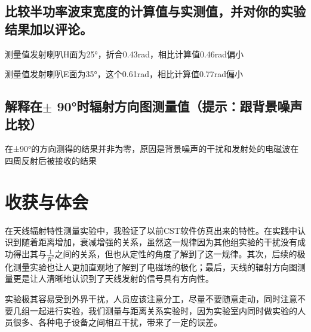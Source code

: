 \documentclass{../source/zjureport}
\begin{document}
    \subsection{比较半功率波束宽度的计算值与实测值，并对你的实验结果加以评论。}
    测量值发射喇叭H面为25°，折合0.43rad，相比计算值0.46rad偏小

    测量值发射喇叭E面为35°，这个0.61rad，相比计算值0.77rad偏小

    \subsection{解释在$\pm$ 90°时辐射方向图测量值（提示：跟背景噪声比较）}
    在±90°的方向测得的结果并非为零，原因是背景噪声的干扰和发射处的电磁波在四周反射后被接收的结果

    \section{收获与体会}
    在天线辐射特性测量实验中，我验证了以前CST软件仿真出来的特性。在实践中认识到随着距离增加，衰减增强的关系，虽然这一规律因为其他组实验的干扰没有成功得出其与$\frac{1}{R^2}$之间的关系，但也从定性的角度了解到了这一规律。其次，后续的极化测量实验也让人更加直观地了解到了电磁场的极化；最后，天线的辐射方向图测量更是让人清晰地认识到了天线发射的信号具有方向性。

    实验极其容易受到外界干扰，人员应该注意分工，尽量不要随意走动，同时注意不要几组一起进行实验，我们测量与距离关系实验时，因为实验室内同时做实验的人员很多、各种电子设备之间相互干扰，带来了一定的误差。
\end{document}
